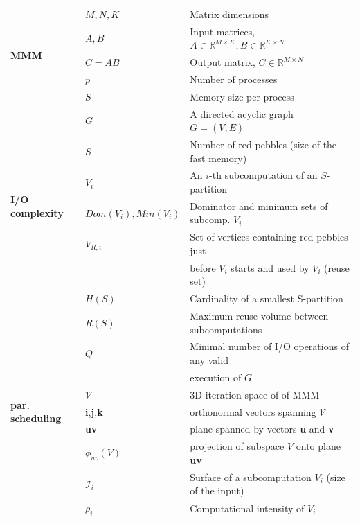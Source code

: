 \documentclass[sigplan,review,anonymous]{acmart}\settopmatter{printfolios=true,printccs=false,printacmref=false}
\begin{document}
\begin{table}[h!]

 \centering
 \footnotesize
 \sf
 \begin{tabular}{@{}l|ll@{}}
 	\toprule
 	\multirow{5}{*}{\begin{turn}{90}\textbf{MMM}\end{turn}}
 	& $M, N, K$& Matrix dimensions \\
 	& $A, B$& Input matrices, $A \in \mathbb{R}^{M \times K}, B \in 
 	\mathbb{R}^{K \times N}$ \\
 	& $C = AB$& Output matrix, $C \in \mathbb{R}^{M \times N}$ \\
 	& $p$& Number of processes \\
 	& $S$& Memory size per process \\
 	\midrule
 	\multirow{7}{*}{\begin{turn}{90}\textbf{I/O complexity}\end{turn}}
 	& $G$&A directed acyclic graph $G=(V,E)$\\
 	& $S$ & Number of red pebbles (size of the fast memory)\\
 	& $V_i$ & An $i$-th subcomputation of an $S$-partition \\
 	& $Dom(V_i), Min(V_i)$ & Dominator and minimum sets of subcomp. 
 	$V_i$\\
 	& $V_{R,i}$ & Set of vertices containing red pebbles just\\
 	& &  before $V_i$ starts and used by $V_i$ (reuse set) \\
 	& $H(S)$ & Cardinality of a smallest S-partition \\
 	& $R(S)$ & Maximum reuse volume between subcomputations \\
 	& $Q$ & Minimal number of I/O operations of any valid \\ 
 	& & execution of $G$ \\
 	\midrule
 	\multirow{3}{*}{\begin{turn}{90}\textbf{par. scheduling}\end{turn}}  
 	& $\mathcal{V}$ & 3D iteration space of of MMM~\cite{tiling}\\         
 	& \textbf{i},\textbf{j},\textbf{k} & orthonormal vectors spanning 
 	$\mathcal{V}$\\
 	& \textbf{uv} & plane spanned by vectors \textbf{u} and \textbf{v}\\
 	& $\phi_{uv}(V)$ & projection of subspace $V$ onto plane \textbf{uv}\\
 	& $\mathcal{I}_i$ & Surface of a subcomputation $V_i$ (size of the 
 	input)\\
 	& $\rho_i$ & Computational 
 	intensity of $V_i$\\
 	\midrule
 	

\end{tabular}
\end{table}
\end{document}
